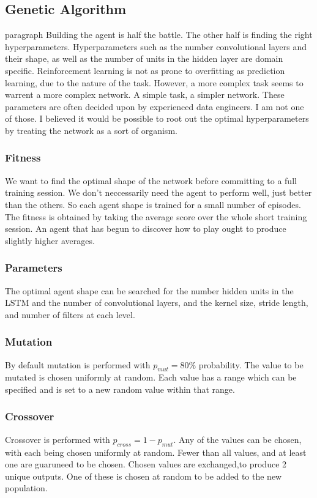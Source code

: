 \documentclass[letterpaper,twocolumn,10pt]{article}
\begin{document}
        \subsection{Genetic Algorithm}
            paragraph{} Building the agent is half the battle. The other half is finding the right hyperparameters. Hyperparameters such as the number convolutional layers and their shape, as well as the number of units in the hidden layer are domain specific. Reinforcement learning is not as prone to overfitting as prediction learning, due to the nature of the task. However, a more complex task seems to warrent a more complex network. A simple task, a simpler network. These parameters are often decided upon by experienced data engineers. I am not one of those. I believed it would be possible to root out the optimal hyperparameters by treating the network as a sort of organism. 
            \subsubsection{Fitness}
                We want to find the optimal shape of the network before committing to a full training session. We don't neccessarily need the agent to perform well, just better than the others. So each agent shape is trained for a small number of episodes. The fitness is obtained by taking the average score over the whole short training session. An agent that has begun to discover how to play ought to produce slightly higher averages.
            \subsubsection{Parameters}
                The optimal agent shape can be searched for the number hidden units in the LSTM and the number of convolutional layers, and the kernel size, stride length, and number of filters at each level. 
            \subsubsection{Mutation}
                By default mutation is performed with $p_{mut}= 80\%$ probability. The value to be mutated is chosen uniformly at random. Each value has a range which can be specified and is set to a new random value within that range.
            \subsubsection{Crossover}
                Crossover is performed with $p_{cross} = 1- p_{mut}$. Any of the values can be chosen, with each being chosen uniformly at random. Fewer than all values, and at least one are guaruneed to be chosen. Chosen values are exchanged,to produce 2 unique outputs. One of these is chosen at random to be added to the new population.
\end{document}
